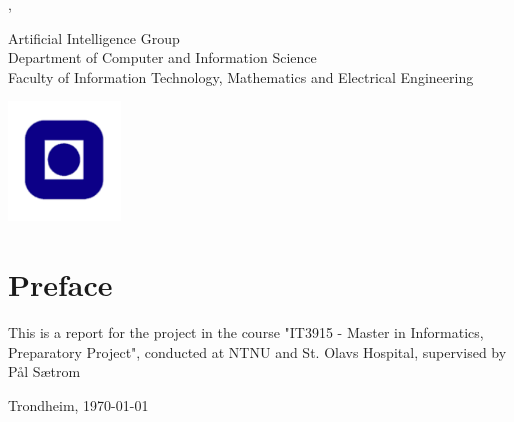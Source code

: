 \begin{titlepage}
\noindent {\large \textbf{\thesisAuthor}}
\vspace{2cm}

\noindent {\Huge \thesisTitle}
\vspace{2cm}

\noindent \thesisType, \thesisDate 
\vspace{2cm}

\noindent Artificial Intelligence Group\\ Department of Computer and Information Science\\ Faculty of Information Technology, Mathematics and Electrical Engineering\\

\vfill
\begin{center}
\includegraphics[width=3cm]{figs/NTNUlogo.pdf}
\end{center}
\end{titlepage}

\thispagestyle{empty}

\cleardoublepage

\frontmatter



\clearpage

\section*{Preface}



\vspace{1cm}

This is a report for the project in the course "IT3915 - Master in Informatics, Preparatory Project", conducted at NTNU and St. Olavs Hospital, supervised by Pål Sætrom 

\vfill

\hfill \thesisAuthor

\hfill Trondheim, \today

\clearpage

\tableofcontents

\listoffigures

\listoftables